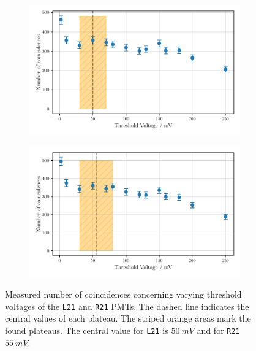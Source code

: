 \begin{figure}
    \centering
    \begin{subfigure}[b]{0.48\textwidth}
        \includegraphics[width=\textwidth]{plots/threshL21.pdf}
    \end{subfigure}\hfill
    \begin{subfigure}[b]{0.48\textwidth}
        \includegraphics[width=\textwidth]{plots/threshR21.pdf}
    \end{subfigure}
    \caption{Measured number of coincidences concerning varying threshold voltages
    of the \texttt{L21} and \texttt{R21} PMTs.
    The dashed line indicates the central values of each plateau. The striped orange areas mark the found plateaus.
    The central value for \texttt{L21} is $\SI{50}{mV}$ and for \texttt{R21} $\SI{55}{mV}$.}
    \label{fig:appthresh6}
\end{figure}

